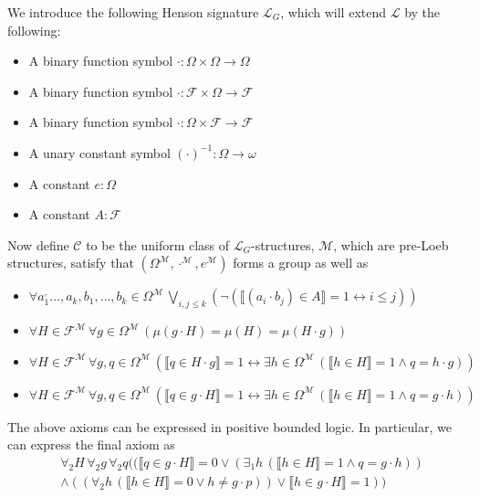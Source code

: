 \documentclass[11pt]{amsart}
\theoremstyle{definition}
\theoremstyle{remark}
\newcommand{\model}[1]{\llbracket {#1} \rrbracket }
\begin{document}
We introduce the following Henson signature $\mathcal{L}_{G}$, which will extend $\mathcal{L}$ by the following:
    \begin{itemize}
        \item A binary function symbol $\cdot: \Omega \times \Omega \to \Omega$
        \item A binary function symbol $\cdot:  \mathcal{F}\times \Omega \to \mathcal{F}$
        \item A binary function symbol $\cdot: \Omega \times \mathcal{F} \to \mathcal{F}$
        \item A unary constant symbol $(\cdot)^{-1}: \Omega \to \omega$
        \item A constant $e : \Omega$
        \item A constant $A: \mathcal{F}$
    \end{itemize}
       Now define $\mathscr{C}$ to be the uniform class of $\mathcal{L}_{G}$-structures, $\mathcal{M}$, which are pre-Loeb structures, satisfy that $(\Omega^\mathcal{M},\cdot^\mathcal{M},e^\mathcal{M})$ forms a group as well as
       \begin{itemize}
           \item $\forall a_1^, \ldots, a_k, b_1,\ldots,b_k \in \Omega^{\mathcal{M}}\, \bigvee_{i,j \le k}(\neg (\model{(a_i\cdot b_j) \in A} =1 \leftrightarrow i\le j))$
           \item $\forall H \in \mathcal{F}^{\mathcal{M}}\, \forall g \in \Omega^{\mathcal{M}}\,(\mu(g\cdot H) = \mu(H)=\mu(H\cdot g))$
             \item $\forall H \in \mathcal{F}^{\mathcal{M}}\, \forall g,q \in \Omega^{\mathcal{M}}\,(\model{q \in H\cdot g} =1 \leftrightarrow \exists h\in \Omega^{\mathcal{M}}\,(\model{h \in H} =1 \land q = h\cdot g))$
           \item $\forall H \in \mathcal{F}^{\mathcal{M}}\, \forall g,q \in \Omega^{\mathcal{M}}\,(\model{q \in g\cdot H} =1 \leftrightarrow \exists h\in \Omega^{\mathcal{M}}\,(\model{h \in H} =1 \land q =g\cdot h))$
       \end{itemize}
The above axioms can be expressed in positive bounded logic. In particular, we can express the final axiom as
\begin{equation*}
    \begin{aligned}
        & \forall_2 H\, \forall_2 g\,\forall_2 q((\model{q \in g\cdot H} =0 \lor (\exists_1 h\,(\model{h \in H} =1 \land q =g\cdot h))\\
        &\land ((\forall_2 h\,(\model{h \in H} =0 \lor h \neq g\cdot p))\lor\model{h \in g\cdot H} =1)) 
    \end{aligned}
\end{equation*}
\end{document}
